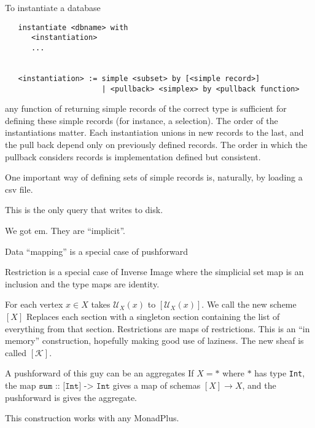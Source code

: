 \documentclass[a4paper,12pt]{article}
\theoremstyle{mydef}
\theoremstyle{myremark}
\begin{document}
To instantiate a database
\begin{verbatim}
   instantiate <dbname> with
      <instantiation>
      ...


   <instantiation> := simple <subset> by [<simple record>]
                      | <pullback> <simplex> by <pullback function>
\end{verbatim}

any function of returning simple records of the correct type is sufficient for defining these simple records (for instance, a selection).
The order of the instantiations matter.
Each instantiation unions in new records to the last, and the pull back depend only on previously defined records.
The order in which the pullback considers records is implementation defined but consistent.

One important way of defining sets of simple records is, naturally, by loading a csv file.

This is the only query that writes to disk.  


We got em.
They are ``implicit''.

Data ``mapping'' is a special case of pushforward 

Restriction is a special case of Inverse Image where the simplicial set map is an inclusion and the type maps are identity.  


For each vertex $x\in X$ takes $\mathcal{U}_X(x)$ to $\left[\mathcal{U}_X(x)\right]$.
We call the new scheme $[X]$
Replaces each section with a singleton section containing the list of everything from that section.
Restrictions are maps of restrictions.  
This is an ``in memory'' construction, hopefully making good use of laziness.
The new sheaf is called $[\mathcal{K}]$.  

A pushforward of this guy can be an aggregates
If $X=*$ where $*$ has type \texttt{Int}, the map $\texttt{sum :: [Int] -> Int}$ gives a map of schemas $[X]\to X$, and the pushforward is gives the aggregate.  

This construction works with any MonadPlus.
\end{document}
